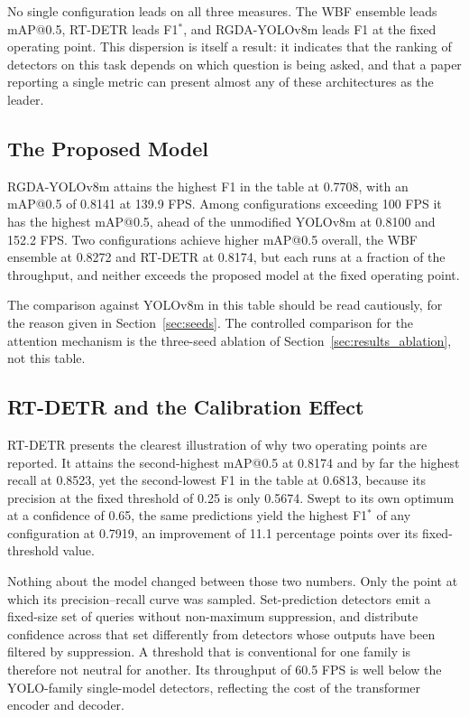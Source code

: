 \documentclass[MScCS]{uccthesis}
\begin{document}
No single configuration leads on all three measures. The WBF ensemble leads
mAP@0.5, RT-DETR leads F1$^{\ast}$, and RGDA-YOLOv8m leads F1 at the fixed
operating point. This dispersion is itself a result: it indicates that the
ranking of detectors on this task depends on which question is being asked, and
that a paper reporting a single metric can present almost any of these
architectures as the leader.

\subsection{The Proposed Model}

RGDA-YOLOv8m attains the highest F1 in the table at 0.7708, with an mAP@0.5 of
0.8141 at 139.9 FPS. Among configurations exceeding 100 FPS it has the highest
mAP@0.5, ahead of the unmodified YOLOv8m at 0.8100 and 152.2 FPS. Two
configurations achieve higher mAP@0.5 overall, the WBF ensemble at 0.8272 and
RT-DETR at 0.8174, but each runs at a fraction of the throughput, and neither
exceeds the proposed model at the fixed operating point.

The comparison against YOLOv8m in this table should be read cautiously, for
the reason given in Section~\ref{sec:seeds}. The controlled comparison for the
attention mechanism is the three-seed ablation of
Section~\ref{sec:results_ablation}, not this table.

\subsection{RT-DETR and the Calibration Effect}

RT-DETR presents the clearest illustration of why two operating points are
reported. It attains the second-highest mAP@0.5 at 0.8174 and by far the
highest recall at 0.8523, yet the second-lowest F1 in the table at 0.6813,
because its precision at the fixed threshold of 0.25 is only 0.5674. Swept to
its own optimum at a confidence of 0.65, the same predictions yield the highest
F1$^{\ast}$ of any configuration at 0.7919, an improvement of 11.1 percentage
points over its fixed-threshold value.

Nothing about the model changed between those two numbers. Only the point at
which its precision--recall curve was sampled. Set-prediction detectors emit a
fixed-size set of queries without non-maximum suppression, and distribute
confidence across that set differently from detectors whose outputs have been
filtered by suppression. A threshold that is conventional for one family is
therefore not neutral for another. Its throughput of 60.5 FPS is well below the
YOLO-family single-model detectors, reflecting the cost of the transformer
encoder and decoder.
\end{document}
